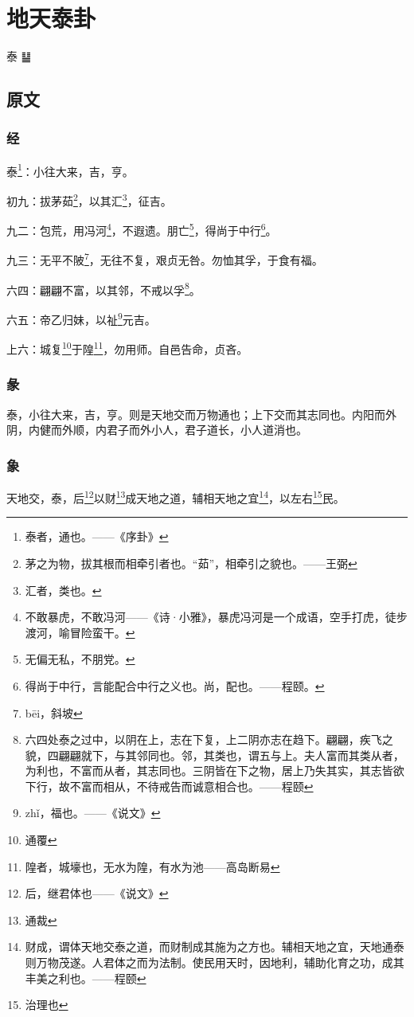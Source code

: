 \documentclass[12pt,oneside]{book}
\begin{document}
\chapter{地天泰卦}
泰 {\Large ䷊}

\section{原文}

\subsection{经}
泰\footnote{泰者，通也。——《序卦》}：小往大来，吉，亨。

初九：拔茅茹\footnote{茅之为物，拔其根而相牵引者也。“茹”，相牵引之貌也。——王弼}，以其汇\footnote{汇者，类也。}，征吉。

九二：包荒，用冯河\footnote{不敢暴虎，不敢冯河——《诗·小雅》，暴虎冯河是一个成语，空手打虎，徒步渡河，喻冒险蛮干。}，不遐遗。朋亡\footnote{无偏无私，不朋党。}，得尚于中行\footnote{得尚于中行，言能配合中行之义也。尚，配也。——程颐。}。

九三：无平不陂\footnote{bēi，斜坡}，无往不复，艰贞无咎。勿恤其孚，于食有福。

六四：翩翩不富，以其邻，不戒以孚\footnote{六四处泰之过中，以阴在上，志在下复，上二阴亦志在趋下。翩翩，疾飞之貌，四翩翩就下，与其邻同也。邻，其类也，谓五与上。夫人富而其类从者，为利也，不富而从者，其志同也。三阴皆在下之物，居上乃失其实，其志皆欲下行，故不富而相从，不待戒告而诚意相合也。——程颐}。

六五：帝乙归妹，以祉\footnote{zhǐ，福也。——《说文》}元吉。

上六：城复\footnote{通覆}于隍\footnote{隍者，城壕也，无水为隍，有水为池——高岛断易}，勿用师。自邑告命，贞吝。

\subsection{彖}
泰，小往大来，吉，亨。则是天地交而万物通也；上下交而其志同也。内阳而外阴，内健而外顺，内君子而外小人，君子道长，小人道消也。

\subsection{象}
天地交，泰，后\footnote{后，继君体也——《说文》}以财\footnote{通裁}成天地之道，辅相天地之宜\footnote{财成，谓体天地交泰之道，而财制成其施为之方也。辅相天地之宜，天地通泰则万物茂遂。人君体之而为法制。使民用天时，因地利，辅助化育之功，成其丰美之利也。——程颐}，以左右\footnote{治理也}民。
\end{document}
